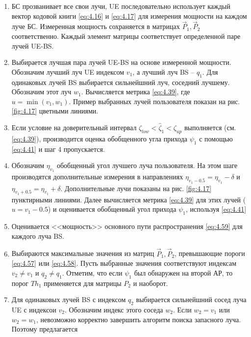 \begin{enumerate}[label=\textbf{Шаг \arabic*:}]
    \item БС прозванивает все свои лучи, UE последовательно использует
          каждый вектор кодовой книги \eqref{eq:4.16} и \eqref{eq:4.17} для
          измерения мощности на каждом луче БС. Измеренная мощность сохраняется
          в матрицах $\vec P_1, \vec P_2$ соответственно. Каждый элемент матрицы соответствует
          определенной паре лучей UE-BS.
    \item Выбирается лучшая пара лучей UE-BS на основе измеренной мощности.
          Обозначим лучший луч UE индексом $v_1$, а лучший луч BS -- $q_1$.
          Для одинаковых лучей BS выбирается сильнейшний луч, соседний лучшему.
          Обозначим этот луч $w_1$. Вычисляется метрика \eqref{eq:4.39}, где $u=\min(v_1,w_1)$.
          Пример выбранных лучей пользователя показан на рис. \ref{fig:4.17} цветными линиями.
    \item Если условие на доверительный интервал $\zeta_{low} < \hat \zeta_1 < \zeta_{up}$
          выполняется (см. \eqref{eq:4.39}), производится оценка обобщенного угла прихода
          $\psi_1$ с помощью \eqref{eq:4.41} и шаг 4 пропускается.
    \item Обозначим $\eta_{v_1}$ обобщенный угол лучшего луча пользователя.
          На этом шаге производятся дополнительные измерения в направлениях
          $\eta_{v_1 - 0.5} = \eta_{v_1} - \delta$ и
          $\eta_{v_1 + 0.5} = \eta_{v_1} + \delta$. Дополнительные лучи
          показаны на рис. \ref{fig:4.17} пунктирными линиями. Далее вычисляется
          метрика \eqref{eq:4.39} для этих лучей ($u=v_1 - 0.5$) и оценивается
          обобщенный угол прихода $\psi_1$, используя \eqref{eq:4.41}
    \item Оценивается <<мощность>> основного пути распространения \eqref{eq:4.59} для каждого луча BS.
    \item Выбираются максимальные значения из матриц $\vec P_1, \vec P_2$,
          превышающие пороги \eqref{eq:4.57} или \eqref{eq:4.58}. Пусть выбранные значения соответствуют
          индексам $v_2\neq v_1$ и $q_2 \neq q_1$.  Отметим, что если $\psi_1$ был
          обнаружен на второй АР, то порог $Th_1$ применяется для матрицы $P_2$ и наоборот.
    \item Для одинаковых лучей BS с индексом $q_2$ выбирается сильнейшний сосед луча UE
          с индексои $v_2$. Обозначим индекс этого соседа $w_2$. Если $w_2 = v_1$ или $w_2=w_1$,
          невозможно корректно завершить алгоритм поиска запасного луча. Поэтому предлагается

\end{enumerate}
